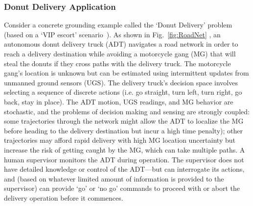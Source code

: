 \subsubsection{Donut Delivery Application} \label{sec:donut_delivery}
Consider a concrete grounding example called the `Donut Delivery' problem (based on a `VIP escort' scenario~\cite{Humphrey2012-lr}). As shown in Fig.~\ref{fig:RoadNet} , an autonomous donut delivery truck (ADT) navigates a road network in order to reach a delivery destination while avoiding a motorcycle gang (MG) that will steal the donuts if they cross paths with the delivery truck. The motorcycle gang's location is unknown but can be estimated using intermittent updates from unmanned ground sensors (UGS). The delivery truck's decision space involves selecting a sequence of discrete actions (i.e. go straight, turn left, turn right, go back, stay in place). The ADT motion, UGS readings, and MG behavior are stochastic, and the problems of decision making and sensing are strongly coupled: some trajectories through the network might allow the ADT to localize the MG before heading to the delivery destination but incur a high time penalty); other trajectories may afford rapid delivery with high MG location uncertainty but increase the risk of getting caught by the MG, which can take multiple paths. A human supervisor monitors the ADT during operation. The supervisor does not have detailed knowledge or control of the ADT---but can interrogate its actions, and (based on whatever limited amount of information is provided to the supervisor) can provide `go' or `no go' commands to proceed with or abort the delivery operation before it commences. 

